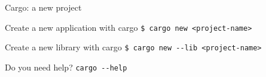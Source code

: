 \begin{frame}{Cargo: a new project}
    \begin{block}{Create a new application with cargo}
        \tt{\$ cargo new <project-name>}
    \end{block}

    \begin{block}{Create a new library with cargo}
        \tt{\$ cargo new -{}-lib <project-name>}
    \end{block}

    \begin{alertblock}{Do you need help?}
        \tt{cargo -{}-help}
    \end{alertblock}
\end{frame}